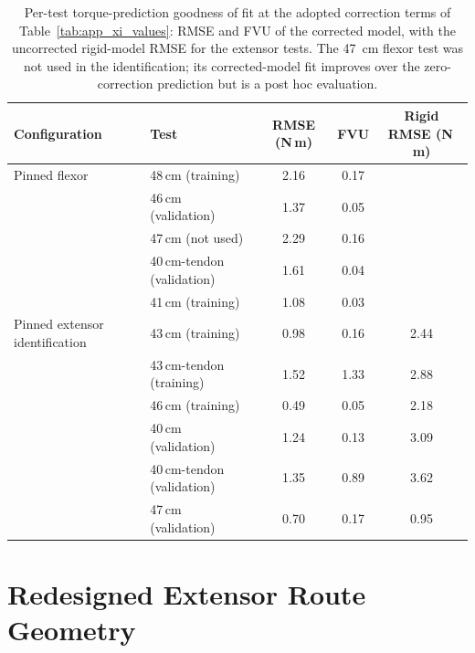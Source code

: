 \begin{table}[htbp]
\caption{Per-test torque-prediction goodness of fit at the adopted correction terms of Table~\ref{tab:app_xi_values}: RMSE and FVU of the corrected model, with the uncorrected rigid-model RMSE for the extensor tests. The \qty{47}{\cm} flexor test was not used in the identification; its corrected-model fit improves over the zero-correction prediction but is a post hoc evaluation.}
\label{tab:app_gof}
\begin{tabular}{@{}llccc@{}}
\toprule
\textbf{Configuration} & \textbf{Test} & \textbf{RMSE} (N\,m) & \textbf{FVU} & \textbf{Rigid RMSE} (N\,m) \\
\midrule
Pinned flexor & 48\,cm (training) & 2.16 & 0.17 & \\
 & 46\,cm (validation) & 1.37 & 0.05 & \\
 & 47\,cm (not used) & 2.29 & 0.16 & \\
 & 40\,cm-tendon (validation) & 1.61 & 0.04 & \\
 & 41\,cm (training) & 1.08 & 0.03 & \\
\midrule
Pinned extensor identification & 43\,cm (training) & 0.98 & 0.16 & 2.44 \\
 & 43\,cm-tendon (training) & 1.52 & 1.33 & 2.88 \\
 & 46\,cm (training) & 0.49 & 0.05 & 2.18 \\
 & 40\,cm (validation) & 1.24 & 0.13 & 3.09 \\
 & 40\,cm-tendon (validation) & 1.35 & 0.89 & 3.62 \\
 & 47\,cm (validation) & 0.70 & 0.17 & 0.95 \\
\bottomrule
\end{tabular}
\end{table}

\section{Redesigned Extensor Route Geometry}\label{app:route_geometry}

